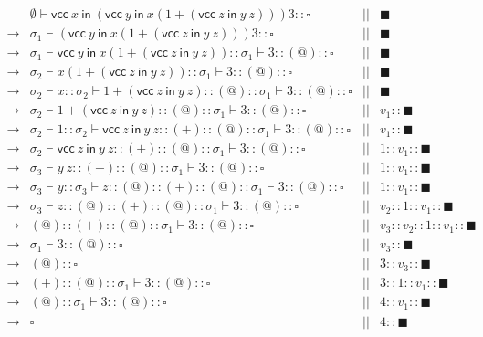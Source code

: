 \[
\begin{array}{lrcr}
& \emptyset\vdash\textsf{vcc}\ x\ \textsf{in}\ (\textsf{vcc}\ y\ \textsf{in}\
x(1+(\textsf{vcc}\ z\ \textsf{in}\ y\     z)))3
::\square &||& \blacksquare \\
\rightarrow& \sigma_1\vdash(\textsf{vcc}\ y\ \textsf{in}\ x(1+(\textsf{vcc}\ z\
\textsf{in}\ y\ z)))3
::\square &||& \blacksquare \\
\rightarrow& \sigma_1\vdash\textsf{vcc}\ y\ \textsf{in}\ x(1+(\textsf{vcc}\ z\
\textsf{in}\ y\ z))::\sigma_1\vdash3::(@)
::\square &||& \blacksquare \\
\rightarrow& \sigma_2\vdash x(1+(\textsf{vcc}\ z\ \textsf{in}\ y\
z))::\sigma_1\vdash3::(@)
::\square &||& \blacksquare \\
\rightarrow& \sigma_2\vdash x::\sigma_2\vdash 1+(\textsf{vcc}\ z\ \textsf{in}\ y\
z)::(@)::\sigma_1\vdash3::(@)
::\square &||& \blacksquare \\
\rightarrow& \sigma_2\vdash 1+(\textsf{vcc}\ z\ \textsf{in}\ y\
z)::(@)::\sigma_1\vdash3::(@)
::\square &||& v_1::\blacksquare \\
\rightarrow& \sigma_2\vdash 1::\sigma_2\vdash\textsf{vcc}\ z\ \textsf{in}\ y\
z::(+)::(@)::\sigma_1\vdash3::(@)
::\square &||& v_1::\blacksquare \\
\rightarrow& \sigma_2\vdash\textsf{vcc}\ z\ \textsf{in}\ y\
z::(+)::(@)::\sigma_1\vdash3::(@)
::\square &||& 1::v_1::\blacksquare \\
\rightarrow& \sigma_3\vdash y\ z::(+)::(@)::\sigma_1\vdash3::(@)
::\square &||& 1::v_1::\blacksquare \\
\rightarrow& \sigma_3\vdash y::\sigma_3\vdash
z::(@)::(+)::(@)::\sigma_1\vdash3::(@)
::\square &||& 1::v_1::\blacksquare \\
\rightarrow& \sigma_3\vdash z::(@)::(+)::(@)::\sigma_1\vdash3::(@)
::\square &||& v_2::1::v_1::\blacksquare \\
\rightarrow& (@)::(+)::(@)::\sigma_1\vdash3::(@)
::\square &||& v_3::v_2::1::v_1::\blacksquare \\
\rightarrow& \sigma_1\vdash3::(@)
::\square &||& v_3::\blacksquare \\
\rightarrow& (@)
::\square &||& 3::v_3::\blacksquare \\
\rightarrow& (+)::(@)::\sigma_1\vdash3::(@)
::\square &||& 3::1::v_1::\blacksquare \\
\rightarrow& (@)::\sigma_1\vdash3::(@)
::\square &||& 4::v_1::\blacksquare \\
\rightarrow& \square &||& 4::\blacksquare \\
\end{array}
\]

